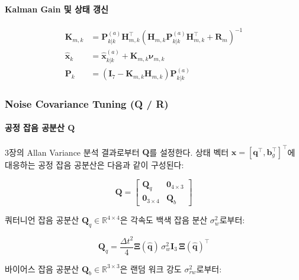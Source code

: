 \paragraph{Kalman Gain 및 상태 갱신}

\begin{align}
    \mathbf{K}_{m,k} &= \mathbf{P}_{k|k}^{(a)}\mathbf{H}_{m,k}^\top\left(\mathbf{H}_{m,k}\mathbf{P}_{k|k}^{(a)}\mathbf{H}_{m,k}^\top + \mathbf{R}_m\right)^{-1} \label{eq:ekf_Km} \\
    \hat{\mathbf{x}}_k &= \hat{\mathbf{x}}_{k|k}^{(a)} + \mathbf{K}_{m,k}\boldsymbol{\nu}_{m,k} \label{eq:ekf_state_update_m} \\
    \mathbf{P}_k &= \left(\mathbf{I}_7 - \mathbf{K}_{m,k}\mathbf{H}_{m,k}\right)\mathbf{P}_{k|k}^{(a)} \label{eq:ekf_cov_update_m}
\end{align}

\subsubsection{Noise Covariance Tuning (Q / R)}

\paragraph{공정 잡음 공분산 $\mathbf{Q}$}

3장의 Allan Variance 분석 결과로부터 $\mathbf{Q}$를 설정한다.
상태 벡터 $\mathbf{x} = [\mathbf{q}^\top, \mathbf{b}_g^\top]^\top$에 대응하는
공정 잡음 공분산은 다음과 같이 구성된다:

\begin{equation}
    \mathbf{Q} = \begin{bmatrix} \mathbf{Q}_q & \mathbf{0}_{4\times 3} \\ \mathbf{0}_{3\times 4} & \mathbf{Q}_b \end{bmatrix}
    \label{eq:ekf_Q}
\end{equation}

쿼터니언 잡음 공분산 $\mathbf{Q}_q \in \mathbb{R}^{4\times 4}$은
각속도 백색 잡음 분산 $\sigma_w^2$로부터:

\begin{equation}
    \mathbf{Q}_q = \frac{\Delta t^2}{4}\boldsymbol{\Xi}(\hat{\mathbf{q}})\,\sigma_w^2 \mathbf{I}_3\,\boldsymbol{\Xi}(\hat{\mathbf{q}})^\top
    \label{eq:ekf_Qq}
\end{equation}

바이어스 잡음 공분산 $\mathbf{Q}_b \in \mathbb{R}^{3\times 3}$은
랜덤 워크 강도 $\sigma_{rw}^2$로부터:


